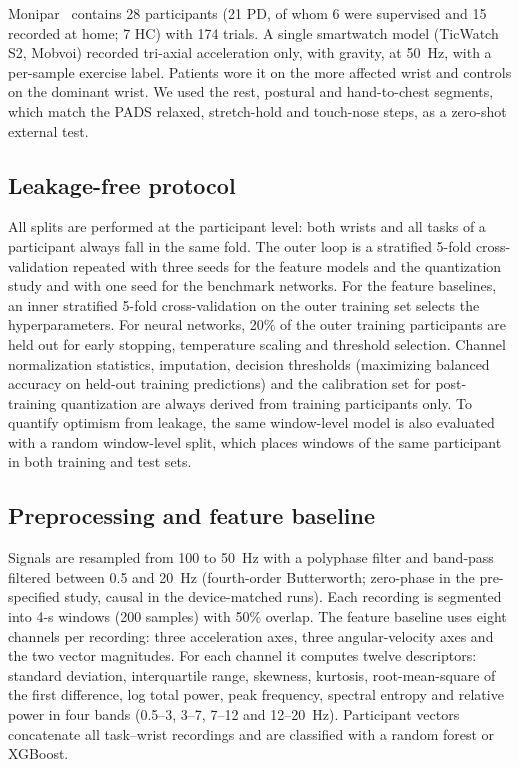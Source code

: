 \documentclass[preprint,12pt]{elsarticle}
\begin{document}
Monipar~\cite{Monipar2023,MoniparData} contains 28 participants (21 PD, of whom 6 were supervised and 15 recorded at home; 7 HC) with 174 trials. A single smartwatch model (TicWatch S2, Mobvoi) recorded tri-axial acceleration only, with gravity, at 50~Hz, with a per-sample exercise label. Patients wore it on the more affected wrist and controls on the dominant wrist. We used the rest, postural and hand-to-chest segments, which match the PADS relaxed, stretch-hold and touch-nose steps, as a zero-shot external test.

\subsection{Leakage-free protocol}
All splits are performed at the participant level: both wrists and all tasks of a participant always fall in the same fold. The outer loop is a stratified 5-fold cross-validation repeated with three seeds for the feature models and the quantization study and with one seed for the benchmark networks. For the feature baselines, an inner stratified 5-fold cross-validation on the outer training set selects the hyperparameters. For neural networks, 20\% of the outer training participants are held out for early stopping, temperature scaling and threshold selection. Channel normalization statistics, imputation, decision thresholds (maximizing balanced accuracy on held-out training predictions) and the calibration set for post-training quantization are always derived from training participants only. To quantify optimism from leakage, the same window-level model is also evaluated with a random window-level split, which places windows of the same participant in both training and test sets.

\subsection{Preprocessing and feature baseline}
Signals are resampled from 100 to 50~Hz with a polyphase filter and band-pass filtered between 0.5 and 20~Hz (fourth-order Butterworth; zero-phase in the pre-specified study, causal in the device-matched runs). Each recording is segmented into 4-s windows (200 samples) with 50\% overlap. The feature baseline uses eight channels per recording: three acceleration axes, three angular-velocity axes and the two vector magnitudes. For each channel it computes twelve descriptors: standard deviation, interquartile range, skewness, kurtosis, root-mean-square of the first difference, log total power, peak frequency, spectral entropy and relative power in four bands (0.5--3, 3--7, 7--12 and 12--20~Hz). Participant vectors concatenate all task--wrist recordings and are classified with a random forest or XGBoost.
\end{document}
